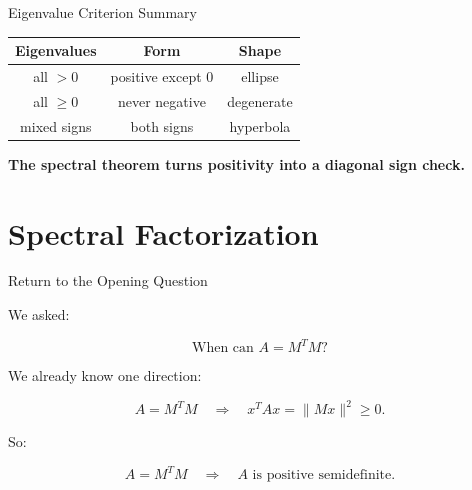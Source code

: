 \documentclass[10pt]{beamer}
\theoremstyle{definition}
\newcommand{\x}[1]{\alert{\textbf{#1}}}
\begin{document}
\begin{frame}{Eigenvalue Criterion Summary}

\begin{center}
\renewcommand{\arraystretch}{1.25}
\begin{tabular}{c|c|c}
\textbf{Eigenvalues} & \textbf{Form} & \textbf{Shape}\\
\hline
all $>0$ & positive except $0$ & ellipse\\
all $\ge0$ & never negative & degenerate\\
mixed signs & both signs & hyperbola
\end{tabular}
\end{center}

\vfill

\begin{center}
\x{The spectral theorem turns positivity into a diagonal sign check.}
\end{center}

\end{frame}


\section{Spectral Factorization}

\begin{frame}{Return to the Opening Question}

We asked:

$$
\boxed{\text{When can }A=M^TM?}
$$

\vfill

We already know one direction:

$$
A=M^TM
\quad\Longrightarrow\quad
x^TAx=\|Mx\|^2\ge0.
$$

\vfill

So:

$$
A=M^TM\quad\Longrightarrow\quad A\text{ is positive semidefinite.}
$$

\end{frame}
\end{document}
